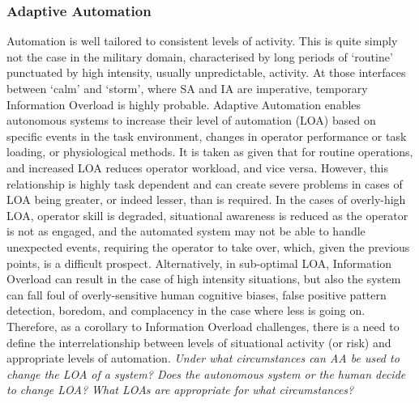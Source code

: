 \subsubsection{Adaptive Automation}
Automation is well tailored to consistent levels of activity. This is quite simply not the case in the military domain, characterised by long periods of ‘routine’ punctuated by high intensity, usually unpredictable, activity. At those interfaces between ‘calm’ and ‘storm’, where SA and IA are imperative, temporary Information Overload is highly probable.
Adaptive Automation enables autonomous systems to increase their level of automation (LOA) based on specific events in the task environment, changes in operator performance or task loading, or physiological methods. 
It is taken as given that for routine operations, and increased LOA reduces operator workload, and vice versa. However, this relationship is highly task dependent and can create severe problems in cases of LOA being greater, or indeed lesser, than is required. 
In the cases of overly-high LOA, operator skill is degraded, situational awareness is reduced as the operator is not as engaged, and the automated system may not be able to handle unexpected events, requiring the operator to take over, which, given the previous points, is a difficult prospect.
Alternatively, in sub-optimal LOA, Information Overload can result in the case of high intensity situations, but also the system can fall foul of overly-sensitive human cognitive biases, false positive pattern detection, boredom, and complacency in the case where less is going on.
Therefore, as a corollary to Information Overload challenges, there is a need to define the interrelationship between levels of situational activity (or risk) and appropriate levels of automation. 
\textit{Under what circumstances can AA be used to change the LOA of a system? Does the autonomous system or the human decide to change LOA? What LOAs are appropriate for what circumstances?}


